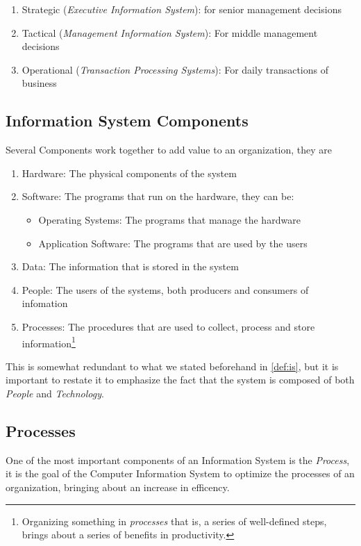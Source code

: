 \documentclass[openright, twoside, twocolumn, a4paper, 10pt]{report}
\begin{document}
\begin{enumerate}
	\item Strategic (\emph{Executive Information System}): for senior management decisions
	\item Tactical (\emph{Management Information System}): For middle management decisions
	\item Operational (\emph{Transaction Processing Systems}): For daily transactions of business
\end{enumerate}

\subsection{Information System Components}
Several Components work together to add value to an organization, they are

\begin{enumerate}
	\item Hardware: The physical components of the system
	\item Software: The programs that run on the hardware, they can be:
	      \begin{itemize}
		      \item Operating Systems: The programs that manage the hardware
		      \item Application Software: The programs that are used by the users
	      \end{itemize}
	\item Data: The information that is stored in the system
	\item People: The users of the systems, both producers and consumers of infomation
	\item Processes: The procedures that are used to collect, process and store information\footnote{%
		      Organizing something in \emph{processes} that is, a series of well-defined steps, brings about a series of
		      benefits in productivity.
	      }
\end{enumerate}

This is somewhat redundant to what we stated beforehand in \cref{def:is}, but it is important to restate it to
emphasize the fact that the system is composed of both \emph{People} and \emph{Technology}.

\subsection{Processes}

One of the most important components of an Information System is the \emph{Process}, it is
the goal of the Computer Information System to optimize the processes of an organization,
bringing about an increase in efficency.
\end{document}
